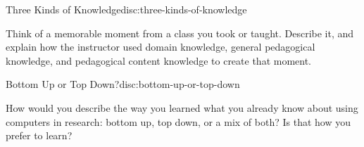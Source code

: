 \begin{discussion}{Three Kinds of Knowledge}{disc:three-kinds-of-knowledge}

Think of a memorable moment from a class you took or taught. Describe
it, and explain how the instructor used domain knowledge, general
pedagogical knowledge, and pedagogical content knowledge to create that
moment.
\end{discussion}

\begin{discussion}{Bottom Up or Top Down?}{disc:bottom-up-or-top-down}

How would you describe the way you learned what you already know about
using computers in research: bottom up, top down, or a mix of both? Is
that how you prefer to learn?
\end{discussion}
